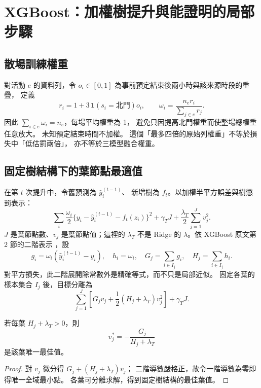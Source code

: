 \section{XGBoost：加權樹提升與能證明的局部步驟}

\subsection{散場訓練權重}
對活動 $e$ 的資料列，令 $o_i\in[0,1]$ 為事前預定結束後兩小時與該來源時段的重疊，
定義
\begin{equation}
r_i=1+3\,\mathbf1(s_i=\text{北門})o_i,\qquad
\omega_i=\frac{n_e r_i}{\sum_{j\in e}r_j}.
\label{eq:weights}
\end{equation}
因此 $\sum_{i\in e}\omega_i=n_e$，每場平均權重為 1，
避免只因提高北門權重而使整場總權重任意放大。
未知預定結束時間不加權。
這個「最多四倍的原始列權重」不等於損失中「低估罰兩倍」，
亦不等於三模型融合權重。

\subsection{固定樹結構下的葉節點最適值}
在第 $t$ 次提升中，令舊預測為 $\hat y_i^{(t-1)}$、
新增樹為 $f_t$。以加權半平方誤差與樹懲罰表示：
\begin{equation}
\sum_i\frac{\omega_i}{2}
\{y_i-\hat y_i^{(t-1)}-f_t(z_i)\}^2
+\gamma_T J+\frac{\lambda_T}{2}\sum_{j=1}^J v_j^2.
\end{equation}
$J$ 是葉節點數、$v_j$ 是葉節點值；這裡的 $\lambda_T$
不是 Ridge 的 $\lambda$。依 XGBoost 原文第 2 節的二階表示
\cite{xgb}，設
\[
g_i=\omega_i(\hat y_i^{(t-1)}-y_i),\quad h_i=\omega_i,\quad
G_j=\sum_{i\in I_j}g_i,\quad H_j=\sum_{i\in I_j}h_i .
\]
對平方損失，此二階展開除常數外是精確等式，而不只是局部近似。
固定各葉的樣本集合 $I_j$ 後，目標分離為
\[
\sum_{j=1}^J\left[G_jv_j+\frac12(H_j+\lambda_T)v_j^2\right]+\gamma_TJ .
\]

\begin{proposition}[固定分區的唯一葉值]
若每葉 $H_j+\lambda_T>0$，則
\begin{equation}
v_j^*=-\frac{G_j}{H_j+\lambda_T}
\label{eq:leaf}
\end{equation}
是該葉唯一最佳值。
\end{proposition}
\begin{proof}
對 $v_j$ 微分得 $G_j+(H_j+\lambda_T)v_j$；
二階導數嚴格正，故令一階導數為零即得唯一全域最小點。
各葉可分離求解，得到固定樹結構的最佳葉值。
\end{proof}

